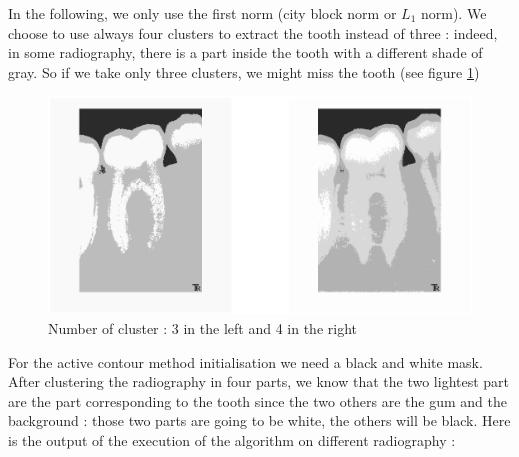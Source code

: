 In the following, we only use the first norm (city block norm or $L_{1}$ norm). We choose to use always four clusters to extract the tooth instead of three : indeed, in some radiography, there is a part inside the tooth with a different shade of gray. So if we take only three clusters, we might miss the tooth (see figure \ref{numberCluster})

\begin{figure}[H]
\centering
\includegraphics[scale=0.3]{images/numberCluster.eps}
\caption{Number of cluster : 3 in the left and 4 in the right}
\label{numberCluster}
\end{figure}

For the active contour method initialisation we need a black and white mask. After clustering the radiography in four parts, we know that the two lightest part are the part corresponding to the tooth since the two others are the gum and the background : those two parts are going to be white, the others will be black. Here is the output of the execution of the algorithm on different radiography :

